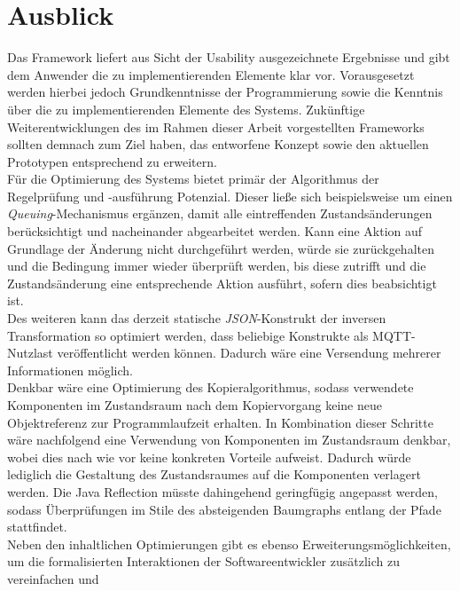 \chapter{Ausblick}
\label{chap:ausblick}
    Das Framework liefert aus Sicht der Usability ausgezeichnete Ergebnisse und gibt dem Anwender die zu implementierenden Elemente klar vor. 
    Vorausgesetzt werden hierbei jedoch Grundkenntnisse der Programmierung sowie die Kenntnis über die zu implementierenden Elemente des Systems. 
    Zukünftige Weiterentwicklungen des im Rahmen dieser Arbeit vorgestellten Frameworks sollten demnach zum Ziel haben, das entworfene Konzept 
    sowie den aktuellen Prototypen entsprechend zu erweitern. 
    \\
    \linebreak
    Für die Optimierung des Systems bietet primär der Algorithmus der Regelprüfung und -ausführung Potenzial. Dieser ließe sich beispielsweise 
    um einen \textit{Queuing}-Mechanismus ergänzen, damit alle eintreffenden Zustandsänderungen berücksichtigt und nacheinander abgearbeitet werden. 
    Kann eine Aktion auf Grundlage der Änderung nicht durchgeführt werden, würde sie zurückgehalten und die Bedingung immer wieder überprüft 
    werden, bis diese zutrifft und die Zustandsänderung eine entsprechende Aktion ausführt, sofern dies beabsichtigt ist. 
    \\
    \linebreak
    Des weiteren kann das derzeit statische \textit{JSON}-Konstrukt der inversen Transformation so optimiert werden, dass beliebige Konstrukte 
    als \acs{MQTT}-Nutzlast veröffentlicht werden können. Dadurch wäre eine Versendung mehrerer Informationen möglich. 
    \\
    Denkbar wäre eine Optimierung des Kopieralgorithmus, sodass verwendete Komponenten im Zustandsraum nach dem Kopiervorgang keine neue 
    Objektreferenz zur Programmlaufzeit erhalten. In Kombination dieser Schritte wäre nachfolgend eine Verwendung von Komponenten im Zustandsraum denkbar, wobei 
    dies nach wie vor keine konkreten Vorteile aufweist. Dadurch würde lediglich die Gestaltung des Zustandsraumes auf die Komponenten verlagert werden. 
    Die Java Reflection müsste dahingehend geringfügig angepasst werden, sodass Überprüfungen im Stile des absteigenden Baumgraphs entlang der Pfade stattfindet.
    \\
    \linebreak
    Neben den inhaltlichen Optimierungen gibt es ebenso Erweiterungsmöglichkeiten, um die formalisierten Interaktionen der Softwareentwickler zusätzlich zu vereinfachen und 
